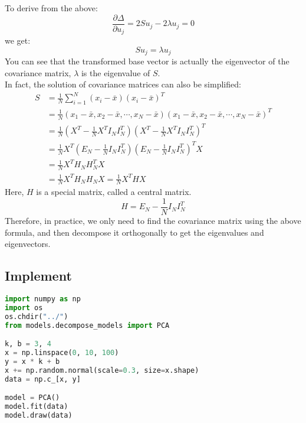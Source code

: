 \documentclass{report}
\begin{document}
To derive from the above:
$$
\frac{\partial \Delta}{\partial u_j}=2S u_j -2\lambda u_j=0
$$
we get:
$$
S u_j = \lambda u_j
$$
You can see that the transformed base vector is actually the eigenvector of the covariance matrix, $\lambda$ is the eigenvalue of $S$.\\
In fact, the solution of covariance matrices can also be simplified:
$$
\begin{aligned}
S &=\frac{1}{N} \sum_{i=1}^{N}\left(x_{i}-\bar{x}\right)\left(x_{i}-\bar{x}\right)^{T} \\
&=\frac{1}{N}\left(x_{1}-\bar{x}, x_{2}-\bar{x}, \cdots, x_{N}-\bar{x}\right)\left(x_{1}-\bar{x}, x_{2}-\bar{x}, \cdots, x_{N}-\bar{x}\right)^{T} \\
&=\frac{1}{N}\left(X^{T}-\frac{1}{N} X^{T} I_{N} I_{N}^{T}\right)\left(X^{T}-\frac{1}{N} X^{T} I_{N} I_{N}^{T}\right)^{T} \\
&=\frac{1}{N} X^{T}\left(E_{N}-\frac{1}{N} I_{N} I_{N}^T\right)\left(E_{N}-\frac{1}{N} I_{N} I_{N}^T\right)^{T} X \\
&=\frac{1}{N} X^{T} H_{N} H_{N}^{T} X \\
&=\frac{1}{N} X^{T} H_{N} H_{N} X=\frac{1}{N} X^{T} H X
\end{aligned}
$$
Here, $H$ is a special matrix, called a central matrix.
$$
H=E_N - \frac{1}{N}I_N I_N^T
$$
Therefore, in practice, we only need to find the covariance matrix using the above formula, and then decompose it orthogonally to get the eigenvalues and eigenvectors.
\newpage
\subsection{Implement}
\begin{lstlisting}[language={python}]
import numpy as np
import os
os.chdir("../")
from models.decompose_models import PCA

k, b = 3, 4
x = np.linspace(0, 10, 100)
y = x * k + b
x += np.random.normal(scale=0.3, size=x.shape)
data = np.c_[x, y]

model = PCA()
model.fit(data)
model.draw(data)
\end{lstlisting}
\end{document}
